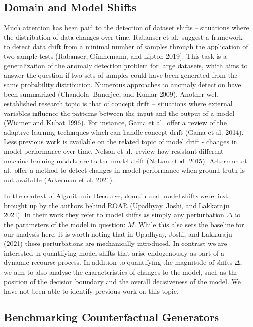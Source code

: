\documentclass[conference,final,]{IEEEtran}
\begin{document}
\hypertarget{related-shifts}{%
\subsection{Domain and Model Shifts}\label{related-shifts}}

Much attention has been paid to the detection of dataset shifts -- situations where the distribution of data changes over time. Rabanser et al.~suggest a framework to detect data drift from a minimal number of samples through the application of two-sample tests (Rabanser, Günnemann, and Lipton 2019). This task is a generalization of the anomaly detection problem for large datasets, which aims to answer the question if two sets of samples could have been generated from the same probability distribution. Numerous approaches to anomaly detection have been summarized (Chandola, Banerjee, and Kumar 2009). Another well-established research topic is that of concept drift -- situations where external variables influence the patterns between the input and the output of a model (Widmer and Kubat 1996). For instance, Gama et al.~offer a review of the adaptive learning techniques which can handle concept drift (Gama et al. 2014). Less previous work is available on the related topic of model drift - changes in model performance over time. Nelson et al.~review how resistant different machine learning models are to the model drift (Nelson et al. 2015). Ackerman et al.~offer a method to detect changes in model performance when ground truth is not available (Ackerman et al. 2021).

In the context of Algorithmic Recourse, domain and model shifts were first brought up by the authors behind ROAR (Upadhyay, Joshi, and Lakkaraju 2021). In their work they refer to model shifts as simply any perturbation \(\Delta\) to the parameters of the model in question: \(M\). While this also sets the baseline for our analysis here, it is worth noting that in Upadhyay, Joshi, and Lakkaraju (2021) these perturbations are mechanically introduced. In contrast we are interested in quantifying model shifts that arise endogenously as part of a dynamic recourse process. In addition to quantifying the magnitude of shifts \(\Delta\), we aim to also analyse the characteristics of changes to the model, such as the position of the decision boundary and the overall decisiveness of the model. We have not been able to identify previous work on this topic.

\hypertarget{related-benchmark}{%
\subsection{Benchmarking Counterfactual Generators}\label{related-benchmark}}
\end{document}
